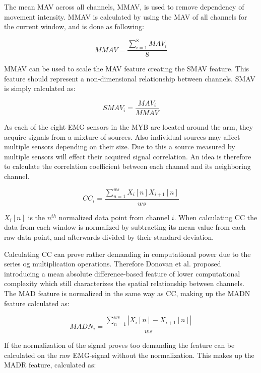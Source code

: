 The mean MAV across all channels, MMAV, is used to remove dependency of movement intensity. MMAV is calculated by using the MAV of all channels for the current window, and is done as following: 

\begin{equation} \label{eq:MMAV}
MMAV=\frac{\sum_{i=1}^{8}MAV_i}{8}
\end{equation}

MMAV can be used to scale the MAV feature creating the SMAV feature. This feature should represent a non-dimensional relationship between channels. SMAV is simply calculated as:

\begin{equation} \label{eq:SMAV}
SMAV_i=\frac{MAV_i}{MMAV}
\end{equation}

As each of the eight EMG sensors in the MYB are located around the arm, they acquire signals from a mixture of sources. Also individual sources may affect multiple sensors depending on their size. Due to this a source measured by multiple sensors will effect their acquired signal correlation. An idea is therefore to calculate the correlation coefficient between each channel and its neighboring channel.  

\begin{equation} \label{eq:CC}
CC_i=\frac{\sum_{n=1}^{ws}X_i[n]X_{i+1}[n]}{ws}
\end{equation}

$X_i[n]$ is the $n^{th}$ normalized data point from channel $i$. When calculating CC the data from each window is normalized by subtracting its mean value from each raw data point, and afterwards divided by their standard deviation. 

Calculating CC can prove rather demanding in computational power due to the series og multiplication operations. Therefore Donovan et al. \cite{Donovan2017} proposed introducing a mean absolute difference-based feature of lower computational complexity which still characterizes the spatial relationship between channels. The MAD feature is normalized in the same way as CC, making up the MADN feature calculated as: 

\begin{equation} \label{eq:MADN}
MADN_i=\frac{\sum_{n=1}^{ws}|X_i[n]-X_{i+1}[n]|}{ws}
\end{equation}

If the normalization of the signal proves too demanding the feature can be calculated on the raw EMG-signal without the normalization. This makes up the MADR feature, calculated as:

